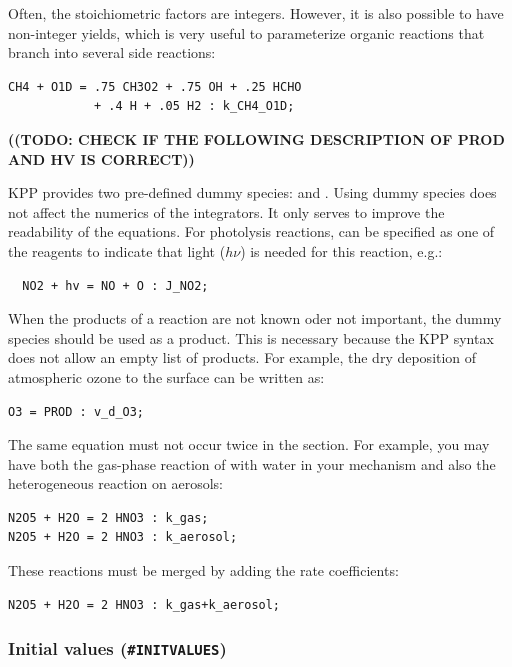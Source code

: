 \documentclass[twoside]{article}
\newcommand{\todo}[1]{{{\color{red}\uppercase{\bf ((TODO: #1))}}}}
\begin{document}
Often, the stoichiometric factors are integers. However, it is also
possible to have non-integer yields, which is very useful to
parameterize organic reactions that branch into several side reactions:
%
\begin{verbatim}
CH4 + O1D = .75 CH3O2 + .75 OH + .25 HCHO
            + .4 H + .05 H2 : k_CH4_O1D;
\end{verbatim}
%
\todo{check if the following description of prod and hv is correct}

KPP provides two pre-defined dummy species:  and .
Using dummy species does not affect the numerics of the integrators. It
only serves to improve the readability of the equations. For photolysis
reactions,  can be specified as one of the reagents to indicate
that light ($h\nu$) is needed for this reaction, e.g.:
%
\begin{verbatim}
  NO2 + hv = NO + O : J_NO2;
\end{verbatim}
%
When the products of a reaction are not known oder not important, the
dummy species  should be used as a product. This is necessary
because the KPP syntax does not allow an empty list of products. For
example, the dry deposition of atmospheric ozone to the surface can be
written as:
%
\begin{verbatim}
O3 = PROD : v_d_O3;
\end{verbatim}
%
The same equation must not occur twice in the  section.
For example, you may have both the gas-phase reaction of 
with water in your mechanism and also the heterogeneous reaction on
aerosols:
%
\begin{verbatim}
N2O5 + H2O = 2 HNO3 : k_gas;
N2O5 + H2O = 2 HNO3 : k_aerosol;
\end{verbatim}
%
These reactions must be merged by adding the rate coefficients:
%
\begin{verbatim}
N2O5 + H2O = 2 HNO3 : k_gas+k_aerosol;
\end{verbatim}

\subsubsection{Initial values ({\tt\#INITVALUES})}
\label{sec:section-initvalues}
\end{document}
